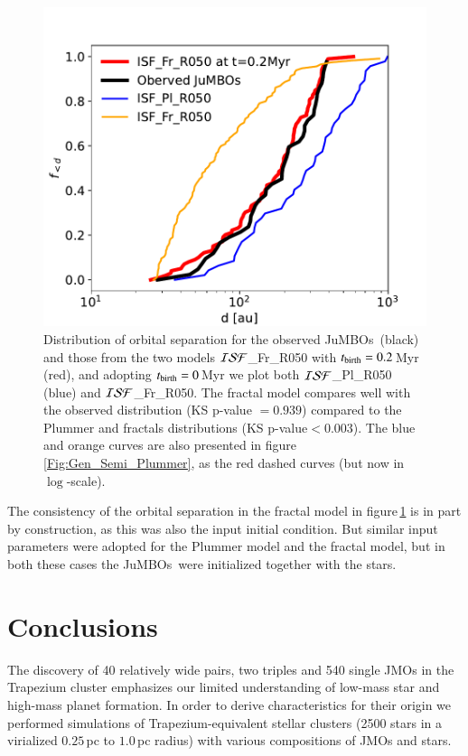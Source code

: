 \documentclass[submission,phys]{lib/SciPost}
\newcommand{\jumbos}{\mbox{JuMBOs}}
\begin{document}
\begin{figure}
    \centering
    \includegraphics[width=0.75\columnwidth]{figures/fig_orbital_separation_ISF.pdf}
    \caption{Distribution of orbital separation for the observed
      \jumbos\, (black) and those from the two models ${\cal
        ISF}$\_Fr\_R050 with $t_{\rm birth} = 0.2$\,Myr (red), and
      adopting $t_{\rm birth} = 0$\,Myr we plot both ${\cal
        ISF}$\_Pl\_R050 (blue) and ${\cal ISF}$\_Fr\_R050. The fractal
      model compares well with the observed distribution (KS p-value
      $= 0.939$) compared to the Plummer and fractals distributions
      (KS p-value$<0.003$). The blue and orange curves are also
      presented in figure\,\ref{Fig:Gen_Semi_Plummer}, as the red
      dashed curves (but now in $\log$-scale).}
    \label{Fig:orbital_separation_ISF_late_foramtion}
\end{figure}

The consistency of the orbital separation in the fractal model in
figure\,\ref{Fig:orbital_separation_ISF_late_foramtion} is in part by
construction, as this was also the input initial condition.  But
similar input parameters were adopted for the Plummer model and the
fractal model, but in both these cases the \jumbos\, were initialized
together with the stars.


\section{Conclusions}\label{Sect:Conclusions}

   
The discovery of 40 relatively wide pairs, two triples and 540 single
JMOs in the Trapezium cluster emphasizes our limited understanding of
low-mass star and high-mass planet formation. In order to derive
characteristics for their origin we performed simulations of
Trapezium-equivalent stellar clusters (2500 stars in a virialized
$0.25$\,pc to $1.0$\,pc radius) with various compositions of JMOs and
stars.
\end{document}
